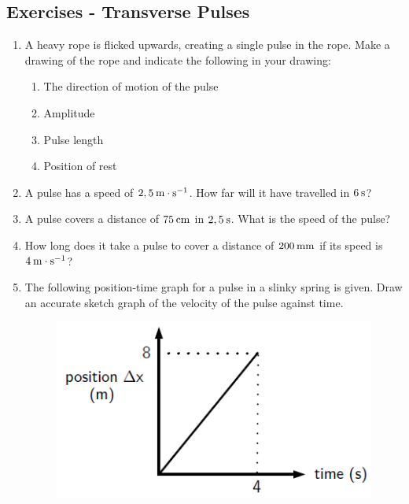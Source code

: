             \subsection{ Exercises - Transverse Pulses}
            \nopagebreak
      \label{m38802*id316647}\begin{enumerate}[noitemsep, label=\textbf{\arabic*}. ] 
            \label{m38802*uid66}\item A heavy rope is flicked upwards, creating a single pulse in the rope. Make a drawing of the rope and indicate the following in your drawing:
\label{m38802*id316663}\begin{enumerate}[noitemsep, label=\textbf{\alph*}. ] 
            \label{m38802*uid67}\item The direction of motion of the pulse
\label{m38802*uid68}\item Amplitude
\label{m38802*uid69}\item Pulse length
\label{m38802*uid70}\item Position of rest
\end{enumerate}
                \label{m38802*uid71}\item A pulse has a speed of $2,5\phantom{\rule{2pt}{0ex}}\mathrm{m}\ensuremath{\cdot}\mathrm{s}{}^{-1}$. How far will it have travelled in $6\phantom{\rule{2pt}{0ex}}\mathrm{s}$?\newline
\label{m38802*uid72}\item A pulse covers a distance of $75\phantom{\rule{2pt}{0ex}}\mathrm{cm}$ in $2,5\phantom{\rule{2pt}{0ex}}\mathrm{s}$. What is the speed of the pulse?\newline
\label{m38802*uid73}\item How long does it take a pulse to cover a distance of $200\phantom{\rule{2pt}{0ex}}\mathrm{mm}$ if its speed is $4\phantom{\rule{2pt}{0ex}}\mathrm{m}\ensuremath{\cdot}\mathrm{s}{}^{-1}$?\newline
\label{m38802*uid74}\item The following position-time graph for a pulse in a slinky spring is given. Draw an accurate sketch graph of the velocity of the pulse against time.
    \setcounter{subfigure}{0}
	\begin{figure}[H] %
    \begin{center}
    \label{m38802*id316803!!!underscore!!!media}\label{m38802*id316803!!!underscore!!!printimage}\includegraphics[width=0.5\columnwidth]{col11305.imgs/m38802_PG10C4_030.png} %

\end{center}
\end{figure}
\end{enumerate}
